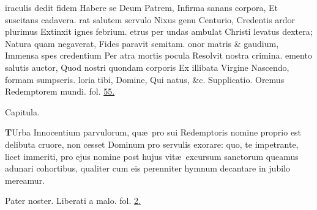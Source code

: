 \documentclass[letter,11pt]{book}
\begin{document}
\begin{multicols*}{2}
iraculis dedit fidem
\newline \indent Habere se Deum Patrem,
\newline \indent Infirma sanans corpora,
\newline \indent Et suscitans cadavera.
rat salutem servulo
\newline \indent Nixus genu Centurio,
\newline \indent Credentis ardor plurimus
\newline \indent Extinxit ignes febrium.
etrus per undas ambulat
\newline \indent Christi levatus dextera;
\newline \indent Natura quam negaverat,
\newline \indent Fides paravit semitam.
onor matris \& gaudium,
\newline \indent Immensa spes credentium
\newline \indent Per atra mortis pocula
\newline \indent Resolvit nostra crimina.
emento salutis auctor,
\newline \indent Quod nostri quondam corporis
\newline \indent Ex illibata Virgine
\newline \indent Nascendo, formam sumpseris.
loria tibi, Domine,
\newline \indent Qui natus, \&c.
\newline \color{Red} Supplicatio. \color{black} Oremus Redemptorem mundi. \color{Red} fol. \color{black} \hyperlink{page.55}{55.}
\vspace{-1.5em} \begin{center} \color{Red} Capitula. \color{black} \end{center} \vspace{-.5em}
\lettrine[lines=2]{\bfseries \color{Red} T}{}Urba Innocentium parvulorum, qu\ae \ pro sui Redemptoris nomine proprio est delibuta cruore, non cesset Dominum pro servulis exorare: quo, te impetrante, licet immeriti, pro ejus nomine post hujus vit\ae \ excursum sanctorum queamus adunari cohortibus, qualiter cum eis perenniter hymnum decantare in jubilo mereamur.
\par Pater noster. Liberati a malo. \color{Red} fol. \color{black} \hyperlink{page.2}{2.}

\end{multicols*}
\end{document}
